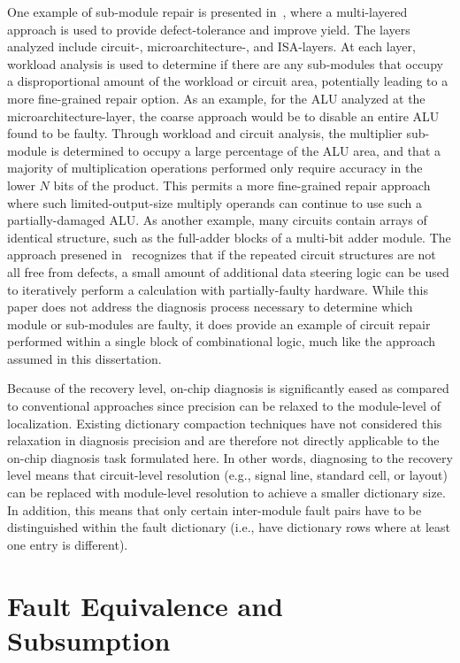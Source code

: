 One example of sub-module repair is presented in~\cite{hsiung15}, where a multi-layered approach is used to provide defect-tolerance and improve yield.
%
The layers analyzed include circuit-, microarchitecture-, and ISA-layers.
%
At each layer, workload analysis is used to determine if there are any sub-modules that occupy a disproportional amount of the workload or circuit area, potentially leading to a more fine-grained repair option.
%
As an example, for the ALU analyzed at the microarchitecture-layer, the coarse approach would be to disable an entire ALU found to be faulty.
%
Through workload and circuit analysis, the multiplier sub-module is determined to occupy a large percentage of the ALU area, and that a majority of multiplication operations performed only require accuracy in the lower $N$ bits of the product.
%
This permits a more fine-grained repair approach where such limited-output-size multiply operands can continue to use such a partially-damaged ALU.
%
As another example, many circuits contain arrays of identical structure, such as the full-adder blocks of a multi-bit adder module.
%
The approach presened in~\cite{hsiung15} recognizes that if the repeated circuit structures are not all free from defects, a small amount of additional data steering logic can be used to iteratively perform a calculation with partially-faulty hardware.
%
While this paper does not address the diagnosis process necessary to determine which module or sub-modules are faulty, it does provide an example of circuit repair performed within a single block of combinational logic, much like the approach assumed in this dissertation.

Because of the recovery level, on-chip diagnosis is significantly eased as compared to conventional approaches since precision can be relaxed to the module-level of localization.
%
Existing dictionary compaction techniques have not considered this relaxation in diagnosis precision and are therefore not directly applicable to the on-chip diagnosis task formulated here.
%
In other words, diagnosing to the recovery level means that circuit-level resolution (e.g., signal line, standard cell, or layout) can be replaced with module-level resolution to achieve a smaller dictionary size.
%
In addition, this means that only certain inter-module fault pairs have to be distinguished within the fault dictionary (i.e., have dictionary rows where at least one entry is different).


\section{Fault Equivalence and Subsumption}
\label{sec:dict_fault_equ_sub}

